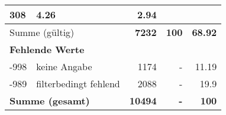 \begin{longtable}{lXrrr}
       \num{308} &
       \num[round-mode=places,round-precision=2]{4.26} &
         \num[round-mode=places,round-precision=2]{2.94} \\
     \midrule
     \multicolumn{2}{l}{Summe (gültig)} &
       \textbf{\num{7232}} &
     \textbf{\num{100}} &
       \textbf{\num[round-mode=places,round-precision=2]{68.92}} \\
     \multicolumn{5}{l}{\textbf{Fehlende Werte}}\\
       -998 &
       keine Angabe &
         \num{1174} &
        - &
         \num[round-mode=places,round-precision=2]{11.19} \\
       -989 &
       filterbedingt fehlend &
         \num{2088} &
        - &
         \num[round-mode=places,round-precision=2]{19.9} \\
     \midrule
     \multicolumn{2}{l}{\textbf{Summe (gesamt)}} &
          \textbf{\num{10494}} &
        \textbf{-} &
        \textbf{\num{100}} \\
     \bottomrule
     \end{longtable}
     
